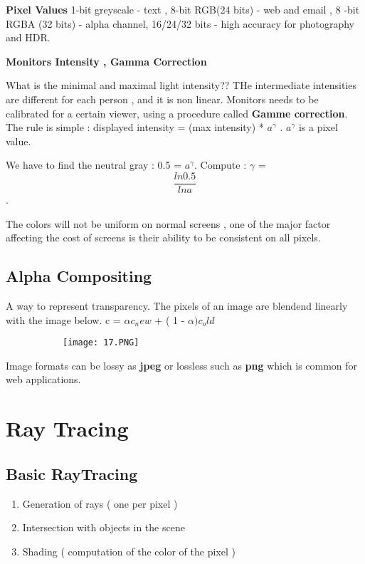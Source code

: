\documentclass{article}
\begin{document}
\vspace{3mm}
\textbf{Pixel Values}
1-bit greyscale - text , 8-bit RGB(24 bits) - web and email , 8 -bit  RGBA (32 bits) - alpha channel,  16/24/32 bits - high accuracy for photography and HDR.

\vspace{3mm}
\textbf{Monitors Intensity , Gamma Correction}

What is the minimal and maximal light intensity?? THe intermediate intensities are different for each person , and it is non linear. Monitors needs to be calibrated for a certain viewer, using a procedure called \textbf{Gamme correction}. The rule is simple : displayed intensity = (max intensity) * $a^\gamma$ . $a^\gamma$ is a pixel value.

We have to find the neutral gray : 0.5 = $a^\gamma$. 
\vspace{2mm}
Compute : $\gamma$ = \[\frac{ln 0.5}{ln a}\].

The colors will not be uniform on normal screens , one of the major factor affecting the cost of screens is their ability to be consistent on all pixels.

\subsection{Alpha Compositing}
A way to represent transparency. The pixels of an image are blendend linearly with the image below.
c = $\alpha c_new$ + ( 1 - $\alpha)c_old$

\begin{figure}[ht!]
  \centering
  \begin{subfigure}[b]{0.3\linewidth}
    \texttt{[image: 17.PNG]}
  \end{subfigure}
\end{figure}

Image formats can be lossy as \textbf{jpeg} or lossless such as \textbf{png} which is common for web applications.

\vspace{50mm}
\section{Ray Tracing}

\subsection{Basic RayTracing}
\begin{enumerate}
    \item Generation of rays ( one per pixel ) 
    \item Intersection with objects in the scene
    \item Shading (  computation of the color of the pixel ) 
\end{enumerate}
\end{document}
